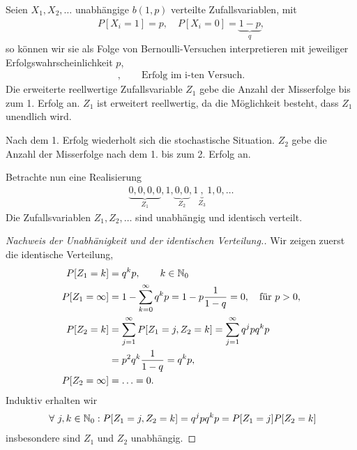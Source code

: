 \begin{bsp}
Seien $X_1,X_2,\ldots$ unabhängige $b(1,p)$ verteilte Zufallsvariablen, mit
\begin{align*}
P[X_i=1] = p,\quad P[X_i=0] = \underbrace{1-p}_{q},
\end{align*}
so können wir sie als Folge von Bernoulli-Versuchen interpretieren mit
jeweiliger Erfolgswahrscheinlichkeit $p$,
\begin{align*}
[X_i=1],\qquad \text{Erfolg im i-ten Versuch}.
\end{align*}
Die erweiterte reellwertige Zufallsvariable $Z_1$ gebe die Anzahl der
Misserfolge bis zum 1. Erfolg an. $Z_1$ ist erweitert reellwertig, da die
Möglichkeit besteht, dass $Z_1$ unendlich wird.

Nach dem 1. Erfolg wiederholt sich die stochastische Situation. $Z_2$ gebe die
Anzahl der Misserfolge nach dem 1. bis zum 2. Erfolg an. 

Betrachte nun eine Realisierung
\begin{align*}
\underbrace{0,0,0,0}_{Z_1},1,\underbrace{0,0}_{Z_2},1\underbrace{,}_{Z_3}1,0,\ldots
\end{align*}
Die Zufallsvariablen $Z_1,Z_2,\ldots$ sind unabhängig und identisch verteilt.
\begin{proof}[Nachweis der Unabhänigkeit und der identischen Verteilung.]
Wir zeigen zuerst die identische Verteilung,
\begin{align*}
P[Z_1=k]&=q^kp,\qquad k\in\mathbb{N}_0\\
P[Z_1=\infty] &= 1-\sum\limits_{k=0}^\infty q^kp
= 1-p\frac{1}{1-q} = 0,\quad \text{für }p > 0,\\
P[Z_2=k] &= \sum\limits_{j=1}^\infty P[Z_1=j, Z_2=k]
= \sum\limits_{j=1}^\infty q^jpq^kp\\
&= p^2q^k \frac{1}{1-q}=q^kp,\\
P[Z_2=\infty] &= \ldots = 0.
\end{align*}
Induktiv erhalten wir
\begin{align*}
\forall j,k\in\N_0 : P[Z_1=j,Z_2=k]=q^jpq^kp = P[Z_1=j]P[Z_2=k]
\end{align*}
insbesondere sind $Z_1$ und $Z_2$ unabhängig.\qedhere


\end{proof}
\end{bsp}
